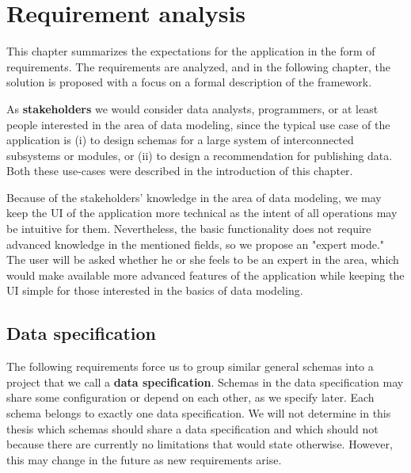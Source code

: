 \chapter{Requirement analysis}\label{chapters:analysis}

This chapter summarizes the expectations for the application in the form of requirements. The requirements are analyzed, and in the following chapter, the solution is proposed with a focus on a formal description of the framework.

\bigskip

As \textbf{stakeholders} we would consider data analysts, programmers, or at least people interested in the area of data modeling, since the typical use case of the application is (i) to design schemas for a large system of interconnected subsystems or modules, or (ii) to design a recommendation for publishing data. Both these use-cases were described in the introduction of this chapter.

Because of the stakeholders' knowledge in the area of data modeling, we may keep the UI of the application more technical as the intent of all operations may be intuitive for them. Nevertheless, the basic functionality does not require advanced knowledge in the mentioned fields, so we propose an "expert mode." The user will be asked whether he or she feels to be an expert in the area, which would make available more advanced features of the application while keeping the UI simple for those interested in the basics of data modeling.

\bigskip






\bigskip





\section{Data specification}

The following requirements force us to group similar general schemas into a project that we call a \textbf{data specification}. Schemas in the data specification may share some configuration or depend on each other, as we specify later. Each schema belongs to exactly one data specification. We will not determine in this thesis which schemas should share a data specification and which should not because there are currently no limitations that would state otherwise. However, this may change in the future as new requirements arise.

